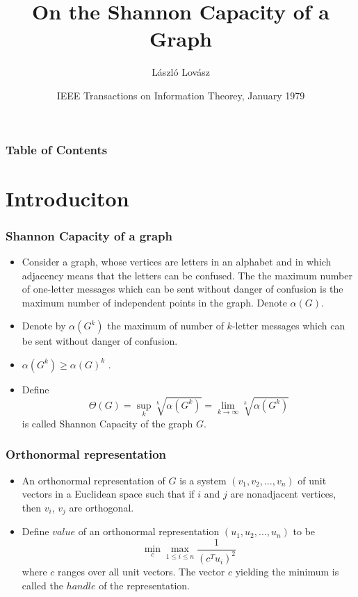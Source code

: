 \documentclass{beamer}
\title[SC of a graph] %
{On the Shannon Capacity of a Graph}
\subtitle{}
\author[Lov\'{a}sz] %
{L\'{a}szl\'{o} Lov\'{a}sz}
\institute[] %
{
}
\date[IEEE 1979] %
{IEEE Transactions on Information Theorey, January 1979}
\begin{document}
\frame{\titlepage}


\begin{frame}
\frametitle{Table of Contents}
\tableofcontents

\end{frame}


\section{Introduciton}

\begin{frame}
\frametitle{Shannon Capacity of a graph}



\begin{itemize}
    \item Consider a graph, whose vertices are letters in an alphabet and in which adjacency means that the letters can be confused. The the maximum number of one-letter messages which can be sent without danger of confusion is the maximum number of independent points in the graph. Denote $\alpha (G)$.
    \item Denote by $\alpha (G^{k})$ the maximum of number of $k$-letter messages which can be sent without danger of confusion.
    \item $\alpha (G^{k}) \geq \alpha (G)^{k}$ .
    \item Define 
\[
\Theta (G) = \sup_{k}\sqrt[k]{\alpha (G^{k})}=\lim_{k \rightarrow \infty}\sqrt[k]{\alpha (G^{k})}
\] 
is called Shannon Capacity of the graph $G$.
\end{itemize}
\end{frame}

\begin{frame}
\frametitle{Orthonormal representation}

\begin{itemize}
\item An orthonormal representation of $G$ is a system $(v_1, v_2,..., v_n)$ of unit vectors in a Euclidean space such that if $i$ and $j$ are nonadjacent vertices, then  $v_i$, $v_j$ are orthogonal.
\item Define $value$ of an orthonormal representation $(u_1, u_2,...,u_n)$ to be
\[
\min_{c} \max_{1\leq i \leq n} \frac{1}{(c^{T}u_i)^2}
\]
where $c$ ranges over all unit vectors. The vector $c$ yielding the minimum is called the $handle$ of the representation.

\end{itemize}
\end{frame}
\end{document}
